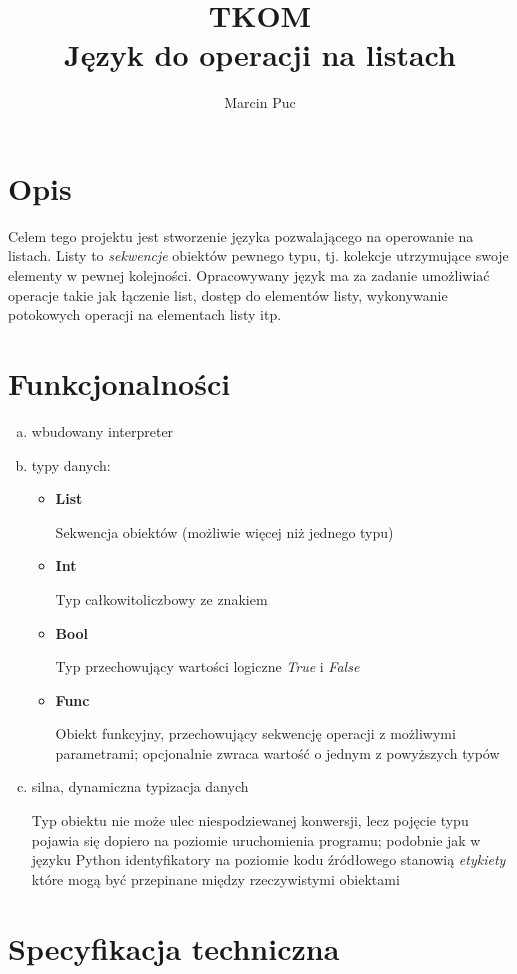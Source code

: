 \documentclass{article}
\title{TKOM\\
	Język do operacji na listach}
\author{Marcin Puc}
\date{}
\begin{document}
\maketitle

\section{Opis}
	Celem tego projektu jest stworzenie języka pozwalającego na operowanie na listach. Listy to \textit{sekwencje} obiektów pewnego typu, tj. kolekcje utrzymujące swoje elementy w pewnej kolejności.
	Opracowywany język ma za zadanie umożliwiać operacje takie jak łączenie list, dostęp do elementów listy, wykonywanie potokowych operacji na elementach listy itp.

\section{Funkcjonalności}
	\begin{enumerate}[a)]
		\item wbudowany interpreter
		\item typy danych:
			\begin{itemize}
				\item{\textbf{List}}

					Sekwencja obiektów (możliwie więcej niż jednego typu)
				\item{\textbf{Int}}

					Typ całkowitoliczbowy ze znakiem
				\item{\textbf{Bool}}

					Typ przechowujący wartości logiczne
					\textit{True} i \textit{False}
				\item{\textbf{Func}}

					Obiekt funkcyjny, przechowujący sekwencję operacji
					z możliwymi parametrami;
					opcjonalnie zwraca wartość o jednym z powyższych typów
			\end{itemize}
		\item silna, dynamiczna typizacja danych

			Typ obiektu nie może ulec niespodziewanej konwersji,
			lecz pojęcie typu pojawia się dopiero na poziomie
			uruchomienia programu;
			podobnie jak w języku Python identyfikatory na poziomie kodu źródłowego
			stanowią \textit{etykiety} które mogą być przepinane między
			rzeczywistymi obiektami
	\end{enumerate}

\section{Specyfikacja techniczna}
\end{document}
